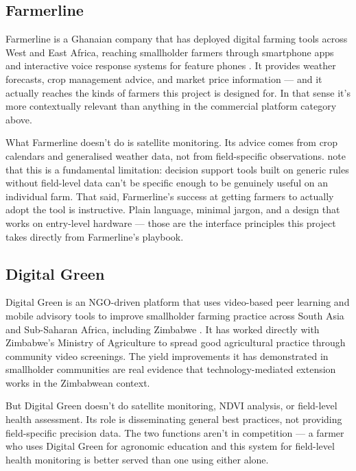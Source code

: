 \documentclass[12pt,a4paper]{report}
\begin{document}
\subsection{Farmerline}

Farmerline is a Ghanaian company that has deployed digital farming tools across West and East Africa, reaching smallholder farmers through smartphone apps and interactive voice response systems for feature phones \citep{farmerline2023}. It provides weather forecasts, crop management advice, and market price information — and it actually reaches the kinds of farmers this project is designed for. In that sense it's more contextually relevant than anything in the commercial platform category above.

What Farmerline doesn't do is satellite monitoring. Its advice comes from crop calendars and generalised weather data, not from field-specific observations. \citet{rose2016} note that this is a fundamental limitation: decision support tools built on generic rules without field-level data can't be specific enough to be genuinely useful on an individual farm. That said, Farmerline's success at getting farmers to actually adopt the tool is instructive. Plain language, minimal jargon, and a design that works on entry-level hardware — those are the interface principles this project takes directly from Farmerline's playbook.

\subsection{Digital Green}

Digital Green is an NGO-driven platform that uses video-based peer learning and mobile advisory tools to improve smallholder farming practice across South Asia and Sub-Saharan Africa, including Zimbabwe \citep{digitalgreen2023}. It has worked directly with Zimbabwe's Ministry of Agriculture to spread good agricultural practice through community video screenings. The yield improvements it has demonstrated in smallholder communities are real evidence that technology-mediated extension works in the Zimbabwean context.

But Digital Green doesn't do satellite monitoring, NDVI analysis, or field-level health assessment. Its role is disseminating general best practices, not providing field-specific precision data. The two functions aren't in competition — a farmer who uses Digital Green for agronomic education and this system for field-level health monitoring is better served than one using either alone.
\end{document}
